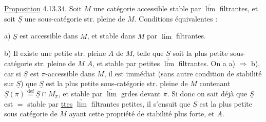 \uline{Proposition} 4.13.34. Soit $M$ une catégorie accessible stable par  $\underrightarrow{\lim}$ filtrantes, et soit $\underline S$ une sous-catégorie str. pleine de $M$. Conditions équivalentes :

a) $\underline S$ est accessible dans $M$, et stable dans $M$ par  $\underrightarrow{\lim}$ filtrantes.

b) Il existe une petite   str. pleine $A$ de $M$, telle que $\underline S$ soit la plus petite sous-catégorie str. pleine de $M$  $A$, et stable par petites $\underrightarrow{\lim}$ filtrantes.
 On a a) $\Longrightarrow$ b),  car si $\underline S$ est $\pi$-accessible dans $M$, il est immédiat (sans autre condition de stabilité sur $\underline S$) que $\underline S$ est la plus petite sous-catégorie str. pleine de $M$ contenant $\underline S(\pi)\overset{\mathrm{def}}{=}\underline S\cap M_\pi$, et stable par $\underrightarrow{\lim}$ grdes devant $\pi$. Si donc on sait déjà que $\underline S$ est $=$ stable par \uline{ttes} $\underrightarrow{\lim}$ filtrantes petites, il s'ensuit que $\underline S$ est la plus petite sous catégorie de $M$ ayant cette propriété de stabilité plus forte, et  $A$.

